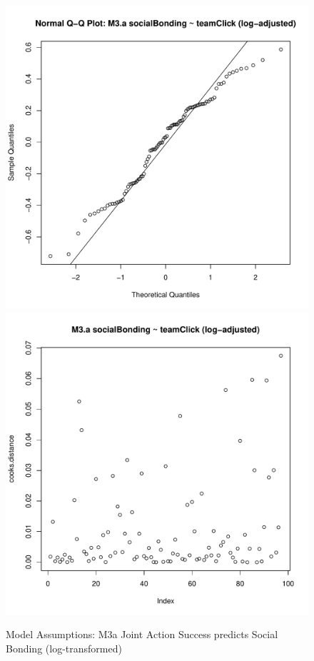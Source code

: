 {\begin{figure}[htbp]
  \includegraphics[scale =.4]{images/MLM3aLogQQNorm.pdf}
  \includegraphics[scale =.4]{images/MLM3aLogCooksD.pdf}
  \caption{Model Assumptions: M3a Joint Action Success predicts Social Bonding (log-transformed)}
  \label{fig:MLM3aLogAssumptions}
\end{figure}








}
